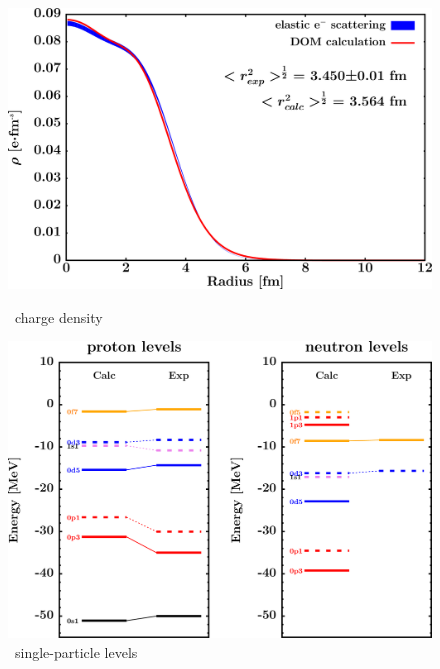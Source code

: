 \begin{figure}[hbtp]
    \centering
    \begin{minipage}{0.42\textwidth}
        \centering
        \includegraphics[width=\textwidth]{figures/ca40_chargeDensity.png}
        \caption*{\caForty\ charge density}
        \label{DOMFitData_ca40_chargeDensity}
    \end{minipage}\hspace{6pt}
    \begin{minipage}{0.42\textwidth}
        \centering
        \includegraphics[width=\textwidth]{figures/ca40_SPLevels.png}
        \caption*{\caForty\ single-particle levels}
        \label{DOMFitData_ca40_SPLevels}
    \end{minipage}
\end{figure}
